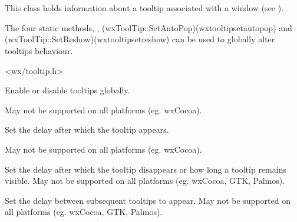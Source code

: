 \section{}\label{wxtooltip}

This class holds information about a tooltip associated with a window
(see ).

The four static methods, ,
\helpref(wxToolTip::SetAutoPop)(wxtooltipsetautopop) and 
\helpref(wxToolTip::SetReshow)(wxtooltipsetreshow) can be used to globally
alter tooltips behaviour.




<wx/tooltip.h>





\label{wxtooltipenable}


Enable or disable tooltips globally.

May not be supported on all platforms (eg. wxCocoa).


\label{wxtooltipsetdelay}


Set the delay after which the tooltip appears.

May not be supported on all platforms (eg. wxCocoa).

\label{wxtooltipsetautopop}


Set the delay after which the tooltip disappears or how long a
tooltip remains visible.
May not be supported on all platforms (eg. wxCocoa, GTK, Palmos).

\label{wxtooltipsetreshow}


Set the delay between subsequent tooltips to appear.
May not be supported on all platforms (eg. wxCocoa, GTK, Palmos).

